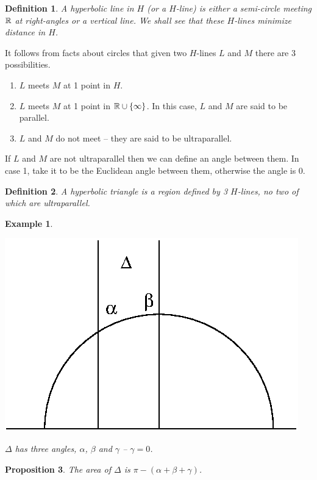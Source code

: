 \documentclass{notes}
\theoremstyle{plain}
\newtheorem{proposition}{Proposition}[chapter]
\newtheorem*{example}{Example}
\newtheorem{definition}[proposition]{Definition}
\begin{document}
\begin{definition}
A hyperbolic line in $H$ (or a $H$-line) is either a semi-circle meeting $\mathbb{R}$
at right-angles or a vertical line.  We shall see that these $H$-lines minimize
distance in $H$.
\end{definition}

It follows from facts about circles that given two $H$-lines $L$ and $M$ there
are 3 possibilities.

\begin{enumerate}
\item $L$ meets $M$ at 1 point in $H$.
\item $L$ meets $M$ at 1 point in $\mathbb{R} \cup \{ \infty \}$.  In this case, $L$
and $M$ are said to be parallel.
\item $L$ and $M$ do not meet -- they are said to be ultraparallel.
\end{enumerate}

If $L$ and $M$ are not ultraparallel then we can define an angle between them.
In case 1, take it to be the Euclidean angle between them, otherwise the
angle is 0.

\begin{definition}
A hyperbolic triangle is a region defined by 3 $H$-lines, no two of which
are ultraparallel.
\end{definition}

\begin{example}\hfill
\begin{center}
\includegraphics{htri1.eps}
\end{center}
$\Delta$ has three angles, $\alpha$, $\beta$ and $\gamma$ -- $\gamma = 0$.
\end{example}

\begin{proposition}
The area of $\Delta$ is $\pi - (\alpha + \beta + \gamma)$.
\end{proposition}
\end{document}
